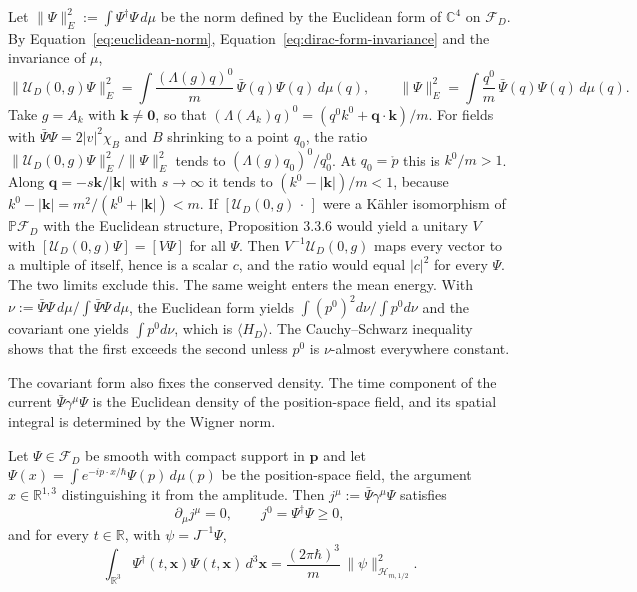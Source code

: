 \begin{remark}\label{rem:euclidean-norm}
	Let $\|\Psi\|_E^2:=\int\Psi^\dagger\Psi\,d\mu$ be the norm defined by the Euclidean form of $\mathbb{C}^4$ on $\mathcal{F}_D$. By Equation~\eqref{eq:euclidean-norm}, Equation~\eqref{eq:dirac-form-invariance} and the invariance of $\mu$,
	\begin{equation*}
		\|\mathcal{U}_D(0,g)\Psi\|_E^2=\int\frac{(\Lambda(g)q)^0}{m}\,\bar{\Psi}(q)\Psi(q)\,d\mu(q),\qquad \|\Psi\|_E^2=\int\frac{q^0}{m}\,\bar{\Psi}(q)\Psi(q)\,d\mu(q).
	\end{equation*}
	Take $g=A_k$ with $\mathbf{k}\neq\mathbf{0}$, so that $(\Lambda(A_k)q)^0=(q^0k^0+\mathbf{q}\cdot\mathbf{k})/m$. For fields with $\bar{\Psi}\Psi=2|v|^2\chi_B$ and $B$ shrinking to a point $q_0$, the ratio $\|\mathcal{U}_D(0,g)\Psi\|_E^2/\|\Psi\|_E^2$ tends to $(\Lambda(g)q_0)^0/q_0^0$. At $q_0=\mathring{p}$ this is $k^0/m>1$. Along $\mathbf{q}=-s\mathbf{k}/|\mathbf{k}|$ with $s\to\infty$ it tends to $(k^0-|\mathbf{k}|)/m<1$, because $k^0-|\mathbf{k}|=m^2/(k^0+|\mathbf{k}|)<m$. If $[\mathcal{U}_D(0,g)\,\cdot\,]$ were a Kähler isomorphism of $\mathbb{P}\mathcal{F}_D$ with the Euclidean structure, Proposition 3.3.6 would yield a unitary $V$ with $[\mathcal{U}_D(0,g)\Psi]=[V\Psi]$ for all $\Psi$. Then $V^{-1}\mathcal{U}_D(0,g)$ maps every vector to a multiple of itself, hence is a scalar $c$, and the ratio would equal $|c|^2$ for every $\Psi$. The two limits exclude this. The same weight enters the mean energy. With $\nu:=\bar{\Psi}\Psi\,d\mu/\int\bar{\Psi}\Psi\,d\mu$, the Euclidean form yields $\int(p^0)^2d\nu/\int p^0d\nu$ and the covariant one yields $\int p^0d\nu$, which is $\langle H_D\rangle$. The Cauchy--Schwarz inequality shows that the first exceeds the second unless $p^0$ is $\nu$-almost everywhere constant.
\end{remark}

The covariant form also fixes the conserved density. The time component of the current $\bar{\Psi}\gamma^\mu\Psi$ is the Euclidean density of the position-space field, and its spatial integral is determined by the Wigner norm.

\begin{proposition}\label{prop:continuity}
	Let $\Psi\in\mathcal{F}_D$ be smooth with compact support in $\mathbf{p}$ and let $\Psi(x)=\int e^{-ip\cdot x/\hbar}\Psi(p)\,d\mu(p)$ be the position-space field, the argument $x\in\mathbb{R}^{1,3}$ distinguishing it from the amplitude. Then $j^\mu:=\bar{\Psi}\gamma^\mu\Psi$ satisfies
	\begin{equation}\label{eq:continuity}
		\partial_\mu j^\mu=0,\qquad j^0=\Psi^\dagger\Psi\geq0,
	\end{equation}
	and for every $t\in\mathbb{R}$, with $\psi=J^{-1}\Psi$,
	\begin{equation}\label{eq:charge}
		\int_{\mathbb{R}^3}\Psi^\dagger(t,\mathbf{x})\Psi(t,\mathbf{x})\,d^3\mathbf{x}=\frac{(2\pi\hbar)^3}{m}\,\|\psi\|^2_{\mathcal{H}_{m,1/2}}.
	\end{equation}
\end{proposition}


